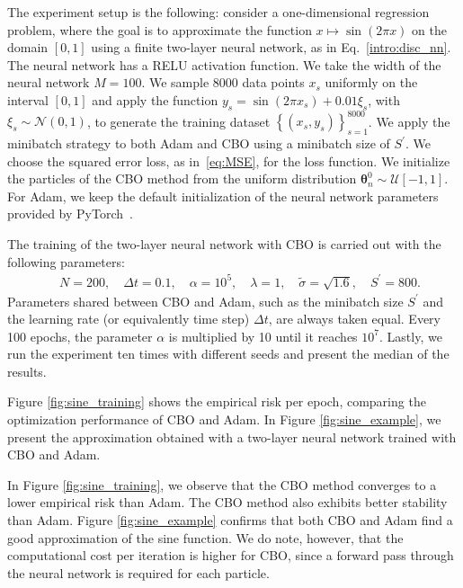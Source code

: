 \documentclass[a4paper, 11pt]{article}
\theoremstyle{plain} %
\begin{document}
	The experiment setup is the following: consider a one-dimensional regression problem, where the goal is to approximate the function $x \mapsto \sin(2\pi x) $ on the domain $ [0,1] $ using a finite two-layer neural network, as in Eq.~\eqref{intro:disc_nn}. The neural network has a RELU activation function. We take the width of the neural network $ M = 100$. We sample 8000 data points $ x_{s} $ uniformly on the interval $[0,1]$ and apply the function $ y_{s} = \sin(2\pi x_{s}) + 0.01 \xi_s$, with $ \xi_s \sim \mathcal{N}(0,1) $, to generate the training dataset $\left\{\left( x_{s}, y_{s} \right)\right\}_{s=1}^{8000}$. We apply the minibatch strategy to both Adam and CBO using a minibatch size of $ S^\prime $. We choose the squared error loss, as in~\eqref{eq:MSE}, for the loss function. We initialize the particles of the CBO method from the uniform distribution $ \bm{\theta}^{0}_{n} \sim \mathcal{U}[-1,1] $. For Adam, we keep the default initialization of the neural network parameters provided by PyTorch~\cite{Pytorch}.
	
	The training of the two-layer neural network with CBO is carried out with the following parameters:
	\begin{align*}
		\quad N = 200, \quad \Delta t = 0.1, \quad \alpha = 10^5, \quad \lambda = 1, \quad \tilde{\sigma} = \sqrt{1.6}, \quad S^\prime = 800.
	\end{align*}
	Parameters shared between CBO and Adam, such as the minibatch size $ S^\prime $ and the learning rate (or equivalently time step) $ \Delta t $, are always taken equal. Every 100 epochs, the parameter $ \alpha $ is multiplied by 10 until it reaches $ 10^7 $. Lastly, we run the experiment ten times with different seeds and present the median of the results.

	Figure \ref{fig:sine_training} shows the empirical risk per epoch, comparing the optimization performance of CBO and Adam. In Figure \ref{fig:sine_example}, we present the approximation obtained with a two-layer neural network trained with CBO and Adam.
	
	In Figure \ref{fig:sine_training}, we observe that the CBO method converges to a lower empirical risk than Adam. The CBO method also exhibits better stability than Adam. Figure \ref{fig:sine_example} confirms that both CBO and Adam find a good approximation of the sine function. We do note, however, that the computational cost per iteration is higher for CBO, since a forward pass through the neural network is required for each particle.
\end{document}
